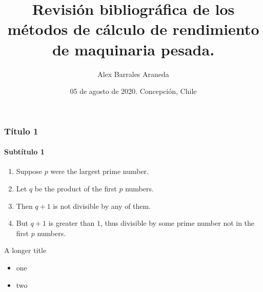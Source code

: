 \documentclass{beamer}
\title{Revisión bibliográfica de los métodos de cálculo de rendimiento  de maquinaria pesada.}
\author[Barrales, A.]
{Alex Barrales Araneda}
\institute[]
{
  Departamento de Ingeniería Industrial\\
  Universidad del Bío-Bío
}
\date[05/08/2020]{05 de agosto de 2020. Concepción, Chile}
\begin{document}
\begin{frame}
\titlepage
\end{frame}


\begin{frame} 
\frametitle{Título 1} 
\framesubtitle{Subtítulo 1} 
\begin{theorem}
\lipsum[0]
\end{theorem}
\begin{enumerate} 
\item<1-| alert@1> Suppose $p$ were the largest prime number. 
\item<2-> Let $q$ be the product of the first $p$ numbers. 
\item<3-> Then $q+1$ is not divisible by any of them. 
\item<1-> But $q + 1$ is greater than $1$, thus divisible by some prime
number not in the first $p$ numbers.
\end{enumerate}
\end{frame}

\begin{frame}{A longer title}
\begin{itemize}
\item one
\item two
\end{itemize}
\end{frame}
\end{document}
